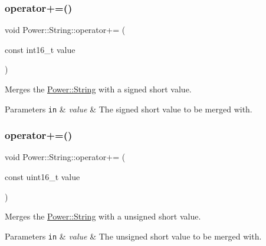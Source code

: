 \subsubsection{\texorpdfstring{operator+=()}{operator+=()}\hspace{0.1cm}{\footnotesize\ttfamily [4/11]}}
{\footnotesize\ttfamily void Power\+::\+String\+::operator+= (\begin{DoxyParamCaption}\item[{const int16\+\_\+t}]{value }\end{DoxyParamCaption})\hspace{0.3cm}{\ttfamily [inline]}}



Merges the \hyperlink{class_power_1_1_string}{Power\+::\+String} with a signed short value. 


\begin{DoxyParams}[1]{Parameters}
\mbox{\tt in}  & {\em value} & The signed short value to be merged with. \\
\hline
\end{DoxyParams}
\mbox{\label{class_power_1_1_string_a9fc5761dcad661b80d309656efc381d4}} 
\subsubsection{\texorpdfstring{operator+=()}{operator+=()}\hspace{0.1cm}{\footnotesize\ttfamily [5/11]}}
{\footnotesize\ttfamily void Power\+::\+String\+::operator+= (\begin{DoxyParamCaption}\item[{const uint16\+\_\+t}]{value }\end{DoxyParamCaption})\hspace{0.3cm}{\ttfamily [inline]}}



Merges the \hyperlink{class_power_1_1_string}{Power\+::\+String} with a unsigned short value. 


\begin{DoxyParams}[1]{Parameters}
\mbox{\tt in}  & {\em value} & The unsigned short value to be merged with. \\
\hline
\end{DoxyParams}
\mbox{\label{class_power_1_1_string_a2e87aa213b473f2fd87da5563132d5b2}} 
